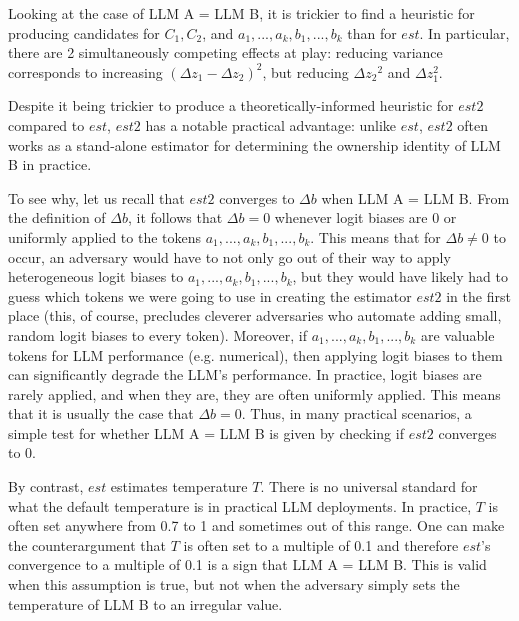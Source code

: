 \documentclass{article}
\begin{document}
Looking at the case of LLM A = LLM B, it is trickier to find a heuristic for producing candidates for $\displaystyle C_{1} ,C_{2}$, and $\displaystyle a_{1} ,...,a_{k} ,b_{1} ,...,b_{k}$ than for $\displaystyle est$. In particular, there are 2 simultaneously competing effects at play: reducing variance corresponds to increasing $\displaystyle \left( \Delta z_{1} -\Delta z_{2}\right)^{2}$, but reducing $\displaystyle \Delta z{_{2}}^{2}$ and $\displaystyle \Delta z_{1}^{2}$.



Despite it being trickier to produce a theoretically-informed heuristic for $\displaystyle est2$ compared to $\displaystyle est$, $\displaystyle est2$ has a notable practical advantage: unlike $\displaystyle est$, $\displaystyle est2$ often works as a stand-alone estimator for determining the ownership identity of LLM B in practice.



To see why, let us recall that $\displaystyle est2$ converges to $\displaystyle \Delta b$ when LLM A = LLM B. From the definition of $\displaystyle \Delta b$, it follows that $\displaystyle \Delta b=0$ whenever logit biases are 0 or uniformly applied to the tokens $\displaystyle a_{1} ,...,a_{k} ,b_{1} ,...,b_{k}$. This means that for $\displaystyle \Delta b\neq 0$ to occur, an adversary would have to not only go out of their way to apply heterogeneous logit biases to $\displaystyle a_{1} ,...,a_{k} ,b_{1} ,...,b_{k}$, but they would have likely had to guess which tokens we were going to use in creating the estimator $\displaystyle est2$ in the first place (this, of course, precludes cleverer adversaries who automate adding small, random logit biases to every token). Moreover, if $\displaystyle a_{1} ,...,a_{k} ,b_{1} ,...,b_{k}$ are valuable tokens for LLM performance (e.g. numerical), then applying logit biases to them can significantly degrade the LLM's performance. In practice, logit biases are rarely applied, and when they are, they are often uniformly applied. This means that it is usually the case that $\displaystyle \Delta b=0$. Thus, in many practical scenarios, a simple test for whether LLM A = LLM B is given by checking if $\displaystyle est2$ converges to 0.



By contrast, $\displaystyle est$ estimates temperature $\displaystyle T$. There is no universal standard for what the default temperature is in practical LLM deployments. In practice, $\displaystyle T$ is often set anywhere from 0.7 to 1 and sometimes out of this range. One can make the counterargument that $\displaystyle T$ is often set to a multiple of 0.1 and therefore $\displaystyle est$'s convergence to a multiple of 0.1 is a sign that LLM A = LLM B. This is valid when this assumption is true, but not when the adversary simply sets the temperature of LLM B to an irregular value.
\end{document}
